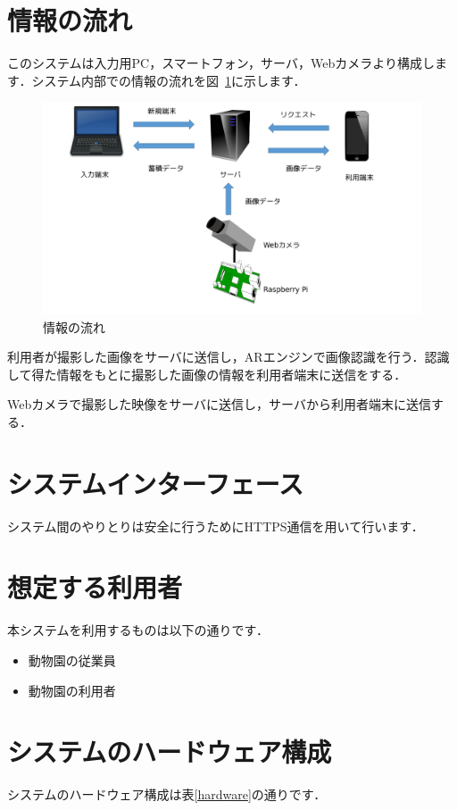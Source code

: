 \documentclass[a4j]{jarticle}
\begin{document}
\section{情報の流れ}
このシステムは入力用PC，スマートフォン，サーバ，Webカメラより構成します．システム内部での情報の流れを図~\ref{data_nagare}に示します．

\begin{figure}[H]
	\begin{center}
		\includegraphics[width=0.8 \linewidth]{data_nagare_2.png}
		\caption{情報の流れ}
		\label{data_nagare}
	\end{center}
\end{figure}

利用者が撮影した画像をサーバに送信し，ARエンジンで画像認識を行う．認識して得た情報をもとに撮影した画像の情報を利用者端末に送信をする．

Webカメラで撮影した映像をサーバに送信し，サーバから利用者端末に送信する．

\section{システムインターフェース}
システム間のやりとりは安全に行うためにHTTPS通信を用いて行います．

\section{想定する利用者}
本システムを利用するものは以下の通りです．
\begin{itemize}
	\item 動物園の従業員
	\item 動物園の利用者
\end{itemize}

\section{システムのハードウェア構成}
システムのハードウェア構成は表\ref{hardware}の通りです．
\end{document}
